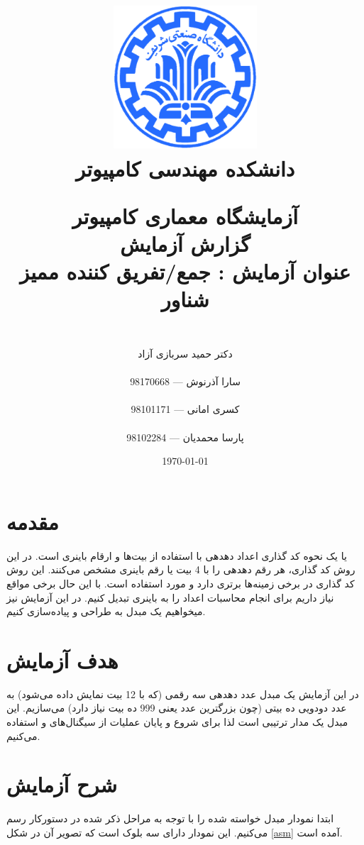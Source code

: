 \documentclass[fleqn]{article}
\title{
\includegraphics[width=0.4\textwidth]{sharif.png}\\
\normalsize{دانشکده مهندسی کامپیوتر}\\
\vspace{1cm}
    
\huge{آزمایشگاه معماری کامپیوتر}
\\ \vspace{.8cm}
\Large{گزارش آزمایش \expnumber}
\\ \vspace{.8cm}
\Large{عنوان آزمایش : جمع/تفریق کننده ممیز شناور}
}
\author{
\\
دکتر حمید سربازی آزاد
\\ \vspace{.4cm}
\\
  سارا آذرنوش       ---      98170668
\\ \vspace{0.2cm} \\
  کسری امانی       ---      98101171
\\ \vspace{0.2cm} \\
  پارسا محمدیان       ---      98102284
\\ \vspace{.4cm}
}
\date{\today}
\newcommand{\expnumber}{چهارم}
\begin{document}
\clearpage\maketitle
\thispagestyle{empty}

\newpage

\pagestyle{fancy}

\rhead{آزمایش \expnumber}

\tableofcontents

\setcounter{page}{1}

\newpage

\section{مقدمه}
یا 
یک نحوه کد گذاری اعداد دهدهی با استفاده از بیت‌ها و ارقام باینری است. در این روش 
کد گذاری، هر رقم دهدهی را با 4 بیت یا رقم باینری مشخص می‌کنند. این روش کد گذاری 
در برخی زمینه‌ها برتری دارد و مورد استفاده است. با این حال برخی مواقع نیاز داریم 
برای انجام محاسبات اعداد 
را به باینری تبدیل کنیم. در این آزمایش نیز میخواهیم یک مبدل 
به 
طراحی و پیاده‌سازی کنیم.

\section{هدف آزمایش}
در این آزمایش یک مبدل عدد دهدهی سه رقمی (که با 12 بیت نمایش داده می‌شود) 
به عدد دودویی ده بیتی (چون بزرگترین عدد یعنی 999 ده بیت نیاز دارد) 
می‌سازیم. این مبدل یک مدار ترتیبی است لذا برای شروع و پایان عملیات از سیگنال‌های 
و
استفاده می‌کنیم.

\section{شرح آزمایش}
ابتدا نمودار 
مبدل خواسته شده را با توجه به مراحل ذکر شده در دستورکار رسم می‌کنیم. این 
نمودار 
دارای سه بلوک است که تصویر آن در شکل 
\ref{asm}
آمده است.
\end{document}
